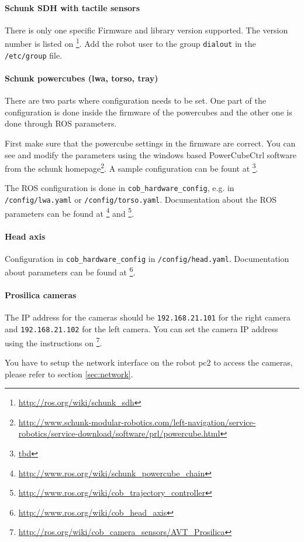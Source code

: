 \paragraph{Schunk SDH with tactile sensors}
There is only one specific Firmware and library version supported. The version number is listed on \footnote{\url{http://ros.org/wiki/schunk_sdh}}. Add the robot user to the group \texttt{dialout} in the \texttt{/etc/group} file.

\paragraph{Schunk powercubes (lwa, torso, tray)}
There are two parts where configuration needs to be set. One part of the configuration is done inside the firmware of the powercubes and the other one is done through ROS parameters.

First make sure that the powercube settings in the firmware are correct. You can see and modify the parameters using the windows based PowerCubeCtrl software from the schunk homepage\footnote{\url{http://www.schunk-modular-robotics.com/left-navigation/service-robotics/service-download/software/prl/powercube.html}}. A sample configuration can be fount at \footnote{\url{tbd}}.

The ROS configuration is done in \texttt{cob\_hardware\_config}, e.g. in \texttt{/config/lwa.yaml} or \texttt{/config/torso.yaml}. Documentation about the ROS parameters can be found at \footnote{\url{http://www.ros.org/wiki/schunk_powercube_chain}} and \footnote{\url{http://www.ros.org/wiki/cob_trajectory_controller}}.

\paragraph{Head axis}
Configuration in \texttt{cob\_hardware\_config} in \texttt{/config/head.yaml}. Documentation about parameters can be found at \footnote{\url{http://www.ros.org/wiki/cob_head_axis}}.

\paragraph{Prosilica cameras}
The IP address for the cameras should be \texttt{192.168.21.101} for the right camera and \texttt{192.168.21.102} for the left camera. You can set the camera IP address using the instructions on \footnote{\url{http://ros.org/wiki/cob_camera_sensors/AVT_Prosilica}}.

You have to setup the network interface on the robot pc2 to access the cameras, please refer to section \ref{sec:network}.

